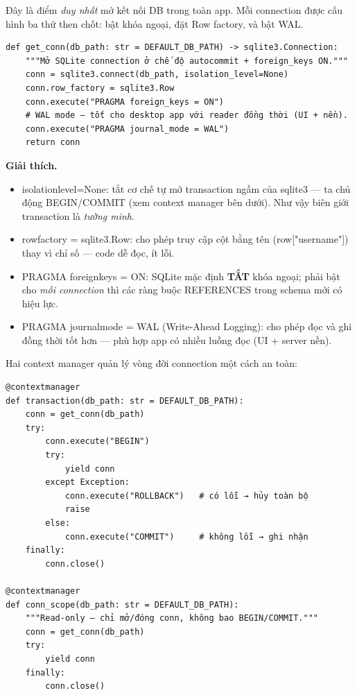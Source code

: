 \documentclass[12pt,a4paper]{article}
\newcommand{\code}[1]{{\ttfamily\small\def\_{\textunderscore\discretionary{}{}{}}#1}}
\begin{document}
Đây là điểm \emph{duy nhất} mở kết nối DB trong toàn app. Mỗi connection được
cấu hình ba thứ then chốt: bật khóa ngoại, đặt Row factory, và bật WAL.

\begin{Verbatim}
def get_conn(db_path: str = DEFAULT_DB_PATH) -> sqlite3.Connection:
    """Mở SQLite connection ở chế độ autocommit + foreign_keys ON."""
    conn = sqlite3.connect(db_path, isolation_level=None)
    conn.row_factory = sqlite3.Row
    conn.execute("PRAGMA foreign_keys = ON")
    # WAL mode — tốt cho desktop app với reader đồng thời (UI + nền).
    conn.execute("PRAGMA journal_mode = WAL")
    return conn
\end{Verbatim}

\textbf{Giải thích.}
\begin{itemize}
  \item \code{isolation\_level=None}: tắt cơ chế tự mở transaction ngầm của
        \code{sqlite3} — ta chủ động \code{BEGIN}/\code{COMMIT} (xem context
        manager bên dưới). Như vậy biên giới transaction là \emph{tường minh}.
  \item \code{row\_factory = sqlite3.Row}: cho phép truy cập cột bằng tên
        (\code{row["username"]}) thay vì chỉ số — code dễ đọc, ít lỗi.
  \item \code{PRAGMA foreign\_keys = ON}: SQLite mặc định \textbf{TẮT} khóa ngoại;
        phải bật cho \emph{mỗi connection} thì các ràng buộc \code{REFERENCES}
        trong schema mới có hiệu lực.
  \item \code{PRAGMA journal\_mode = WAL} (Write-Ahead Logging): cho phép đọc và
        ghi đồng thời tốt hơn — phù hợp app có nhiều luồng đọc (UI + server nền).
\end{itemize}

Hai context manager quản lý vòng đời connection một cách an toàn:

\begin{Verbatim}
@contextmanager
def transaction(db_path: str = DEFAULT_DB_PATH):
    conn = get_conn(db_path)
    try:
        conn.execute("BEGIN")
        try:
            yield conn
        except Exception:
            conn.execute("ROLLBACK")   # có lỗi → hủy toàn bộ
            raise
        else:
            conn.execute("COMMIT")     # không lỗi → ghi nhận
    finally:
        conn.close()

@contextmanager
def conn_scope(db_path: str = DEFAULT_DB_PATH):
    """Read-only — chỉ mở/đóng conn, không bao BEGIN/COMMIT."""
    conn = get_conn(db_path)
    try:
        yield conn
    finally:
        conn.close()
\end{Verbatim}
\end{document}

